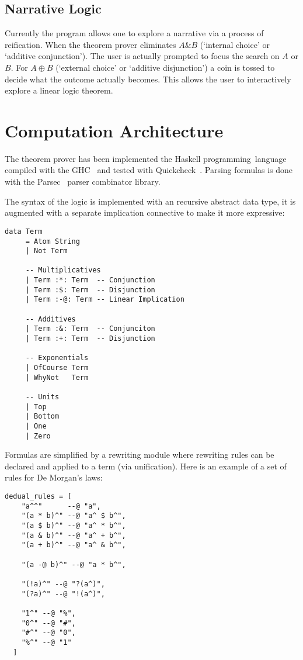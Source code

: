 \documentclass[]{article}
\begin{document}
\subsection{Narrative Logic}

Currently the program allows one to explore a narrative via a process of
reification. When the theorem prover eliminates $A \& B$ (`internal choice' or
`additive conjunction'). The user is actually prompted to focus the search on
$A$ or $B$. For $A \oplus B$ (`external choice' or `additive disjunction') a
coin is tossed to decide what the outcome actually becomes. This allows the
user to interactively explore a linear logic theorem.

\section{Computation Architecture}

The theorem prover has been implemented the Haskell
programming~language~\cite{hudak1992report} compiled with the
GHC~\cite{marlow2004glasgow} and tested with
Quickcheck~\cite{claessen2000quickcheck}. Parsing formulas is done with the
Parsec~\cite{leijen2001parsec} parser combinator library.

The syntax of the logic is implemented with an recursive
abstract data type, it is augmented with a separate implication
connective to make it more expressive:

\begin{verbatim}
data Term 
     = Atom String
     | Not Term

     -- Multiplicatives
     | Term :*: Term  -- Conjunction
     | Term :$: Term  -- Disjunction
     | Term :-@: Term -- Linear Implication

     -- Additives
     | Term :&: Term  -- Conjunciton
     | Term :+: Term  -- Disjunction

     -- Exponentials
     | OfCourse Term
     | WhyNot   Term

     -- Units
     | Top
     | Bottom
     | One
     | Zero
\end{verbatim}

Formulas are simplified by a rewriting module where rewriting rules can be
declared and applied to a term (via unification). Here is an example of a set
of rules for De Morgan's laws:

\begin{verbatim}
dedual_rules = [
    "a^^"      --@ "a",
    "(a * b)^" --@ "a^ $ b^",
    "(a $ b)^" --@ "a^ * b^",
    "(a & b)^" --@ "a^ + b^",
    "(a + b)^" --@ "a^ & b^",

    "(a -@ b)^" --@ "a * b^",

    "(!a)^" --@ "?(a^)",
    "(?a)^" --@ "!(a^)",

    "1^" --@ "%",
    "0^" --@ "#",
    "#^" --@ "0",
    "%^" --@ "1"
  ]
\end{verbatim}
\end{document}
